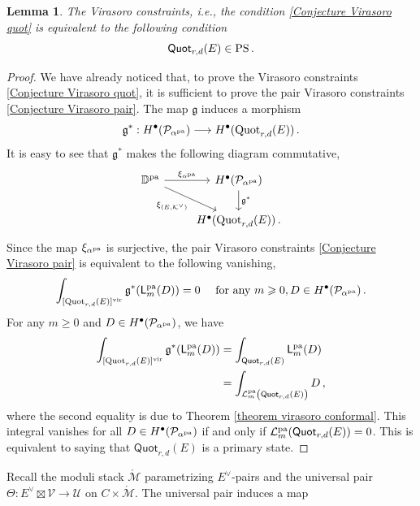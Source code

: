 \documentclass[11pt]{amsart}
\newtheorem{lemma}[theorem]{Lemma}
\theoremstyle{remark}
\renewcommand{\P}{\mathcal{P}}
\newcommand{\mf}[1]{\mathfrak{#1}}
\newcommand{\D}{\mathbb{D}}
\newcommand{\Mdash}{\acute{\mathcal{M}}}
\newcommand{\U}{\mathcal{U}}
\newcommand{\V}{\mathcal{V}}
\newcommand{\quot}[0]{\textnormal{Quot}}
\newcommand{\vir}[0]{\textnormal{vir}}
\newcommand{\pa}[0]{\textnormal{pa}}
\renewcommand{\L}[0]{\mathcal L}
\newcommand{\PS}{\textnormal{PS}}
\newcommand{\kv}{{\mathcal K^\vee}}
\newcommand{\mL}{\mathsf{L}}
\numberwithin{theorem}{section}
\begin{document}
\begin{lemma}\label{Lemma virasoro primary states}
    The Virasoro constraints, i.e., the condition \eqref{Conjecture Virasoro quot} is equivalent to the following condition
    \begin{equation*}\label{condition virasoro primary states}
        \mathsf{Quot}_{r,d}(E) \in \PS\,. 
    \end{equation*}
\end{lemma}
\begin{proof}
    We have already noticed that, to prove the Virasoro constraints \eqref{Conjecture Virasoro quot},
    it is sufficient to prove the pair Virasoro constraints \eqref{Conjecture Virasoro pair}.
    The map $\mf g$ induces a morphism 
$${\mf g}^* : H^{\bullet}(\P_{\alpha^\pa}) \longrightarrow 
H^{\bullet}(\quot_{r,d}(E))\,.$$
It is easy to see that ${\mf g}^*$ makes the following diagram
commutative,
    \begin{equation*}
    \begin{tikzcd}
    \D^\pa\arrow[rd, swap, "\xi_{(E,\kv)}"] \arrow[r,"\xi_{\alpha^{\pa}}"]& H^{\bullet}(\P_{\alpha^\pa}) \arrow[d, "{\mf g}^*"]\\
    & H^\bullet(\quot_{r,d}(E)) \,.
    \end{tikzcd}
\end{equation*}
Since the map $\xi_{\alpha^\pa}$ is surjective,
the pair Virasoro constraints \eqref{Conjecture Virasoro pair} is equivalent to the following vanishing,
$$\int_{[\quot_{r,d}(E)]^\vir} \mf g^* (\mL_m^\pa(D)) = 0 \quad \text{ for any } m \geqslant 0, D \in H^{\bullet} (\P_{\alpha^\pa})\,.$$
For any $m \geqslant 0$ and $D \in H^{\bullet}(\P_{\alpha^\pa})$,
we have
\begin{align*}
\int_{[\quot_{r,d}(E)]^\vir} {\mf g}^* (\mL^\pa_m(D))
& = \int_{\mathsf{Quot}_{r,d}(E)} \mL^\pa_m(D) \\
& = \int_{\L^\pa_m \left(\mathsf{Quot}_{r,d}(E)\right)} D \,,
\end{align*}
where the second equality is due to Theorem \ref{theorem virasoro conformal}.
This integral vanishes for all $D \in H^{\bullet}(\P_{\alpha^\pa})$ if and only if $\L^\pa_m(\mathsf{Quot}_{r,d}(E)) = 0$.
This is equivalent to saying that $\mathsf{Quot}_{r,d}(E)$
is a primary state. 
\end{proof}
Recall the moduli stack $\Mdash$ parametrizing $E^\vee$-pairs 
and the universal pair $\Theta : E^\vee \boxtimes \V \to \U$ on $C \times \Mdash$.
The universal pair induces a map 
\end{document}

